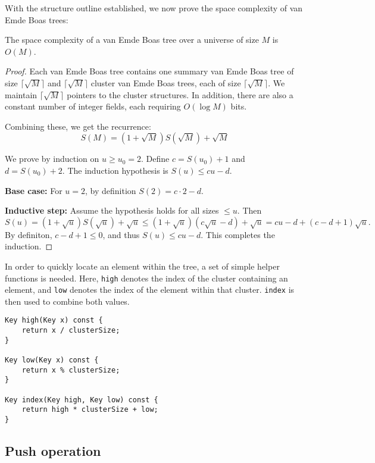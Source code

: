With the structure outline established, we now prove the space complexity of van Emde Boas trees: 
\begin{lemma}
The space complexity of a van Emde Boas tree over a universe of size \( M \) is \( O(M) \).
\end{lemma}

\begin{proof}
Each van Emde Boas tree contains one summary van Emde Boas tree of size \(\lceil \sqrt{M} \rceil\) and \(\lceil \sqrt{M} \rceil\) cluster van Emde Boas trees, each of size \(\lceil \sqrt{M} \rceil\). We maintain \(\lceil \sqrt{M} \rceil\) pointers to the cluster structures. In addition, there are also a constant number of integer fields, each requiring \(O(\log M)\) bits.

Combining these, we get the recurrence:
\[
S(M) = (1 + \sqrt{M}) S(\sqrt{M}) + \sqrt{M}
\]

We prove by induction on \(u \geq u_0 = 2\). Define \(c = S(u_0) + 1\) and \(d = S(u_0) + 2\). The induction hypothesis is \(S(u) \leq c u - d\).

\textbf{Base case:} For \(u = 2\), by definition \(S(2) = c \cdot 2 - d\).

\textbf{Inductive step:} Assume the hypothesis holds for all sizes \(\leq u\). Then
\[
S(u) = (1 + \sqrt{u}) S(\sqrt{u}) + \sqrt{u} \leq (1 + \sqrt{u})(c \sqrt{u} - d) + \sqrt{u} = c u - d + (c - d + 1) \sqrt{u}.
\]
By definiton, \(c - d + 1 \leq 0\), and thus \(S(u) \leq c u - d\). This completes the induction.
\end{proof}

In order to quickly locate an element within the tree, a set of simple helper functions is needed. Here, \texttt{high} denotes the index of the cluster containing an element, and \texttt{low} denotes the index of the element within that cluster. \texttt{index} is then used to combine both values.

\begin{verbatim}
Key high(Key x) const {
    return x / clusterSize;
}

Key low(Key x) const {
    return x % clusterSize;
}

Key index(Key high, Key low) const {
    return high * clusterSize + low;
}
\end{verbatim}

\subsection{Push operation}

